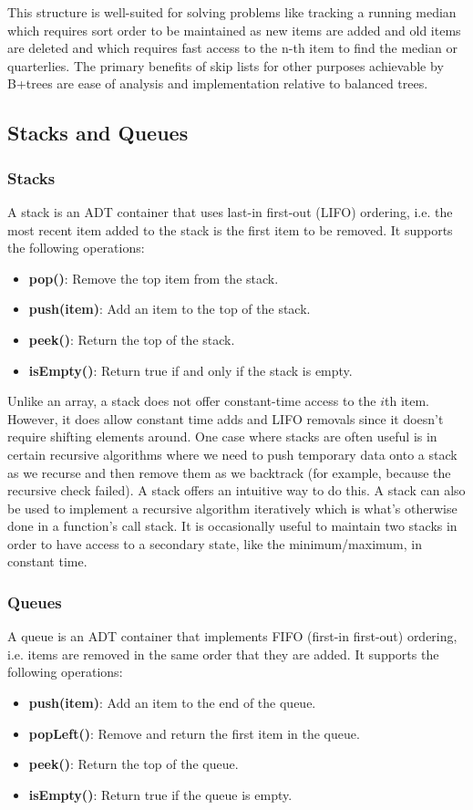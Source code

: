 \documentclass{article}
\begin{document}
    This structure is well-suited for solving problems like tracking a running median which requires sort order to be maintained as new items are added and old items are deleted and which requires fast access to the n-th item to find the median or quarterlies. The primary benefits of skip lists for other purposes achievable by B+trees are ease of analysis and implementation relative to balanced trees.
    
    \subsection{Stacks and Queues}
    \subsubsection{Stacks}
    A stack is an ADT container that uses last-in first-out (LIFO) ordering, i.e. the most recent item added to the stack is the first item to be removed. It supports the following operations:
    \begin{itemize}
        \item  \textbf{pop()}: Remove the top item from the stack.
        \item  \textbf{push(item)}: Add an item to the top of the stack.
        \item \textbf{peek()}: Return the top of the stack.
        \item \textbf{isEmpty()}: Return true if and only if the stack is empty.
    \end{itemize}
    Unlike an array, a stack does not offer constant-time access to the $i$th item. However, it does allow constant time adds and LIFO removals since it doesn't require shifting elements around. One case where stacks are often useful is in certain recursive algorithms where we need to push temporary data onto a stack as we recurse and then remove them as we backtrack (for example, because the recursive check failed). A stack offers an intuitive way to do this. A stack can also be used to implement a recursive algorithm iteratively which is what's otherwise done in a function's call stack. It is occasionally useful to maintain two stacks in order to have access to a secondary state, like the minimum/maximum, in constant time.
    
    \subsubsection{Queues}
    A queue is an ADT container that implements FIFO (first-in first-out) ordering, i.e. items are removed in the same order that they are added. It supports the following operations: 
    \begin{itemize}
        \item \textbf{push(item)}: Add an item to the end of the queue.
        \item \textbf{popLeft()}: Remove and return the first item in the queue.
        \item \textbf{peek()}: Return the top of the queue.
        \item \textbf{isEmpty()}: Return true if the queue is empty. 
    \end{itemize}
    
\end{document}
